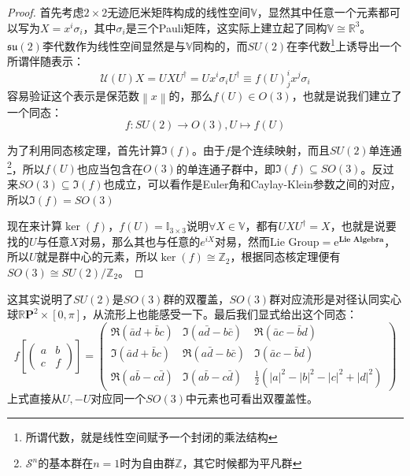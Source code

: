 \begin{proof}
	首先考虑$2\times2$无迹厄米矩阵构成的线性空间$\mathbb{V}$，显然其中任意一个元素都可以写为$X=x^i\sigma_i$，其中$\sigma_i$是三个Pauli矩阵，这实际上建立起了同构$\mathbb{V}\cong\mathbb{R}^3$。$\mathfrak{su}(2)$李代数作为线性空间显然是与$\mathbb{V}$同构的，而$SU(2)$在李代数\footnote{所谓代数，就是线性空间赋予一个封闭的乘法结构}上诱导出一个所谓伴随表示：
	\[
	\mathcal{U}(U)X=UXU^\dagger=Ux^i\sigma_i U^\dagger\equiv f(U)^i_j x^j\sigma_i
	\]
	容易验证这个表示是保范数$\left\|x\right\|$的，那么$f(U)\in O(3)$，也就是说我们建立了一个同态：
	\[f:SU(2)\to O(3),U\mapsto f(U)\]
	
	
	\setlength\parindent{2em}为了利用同态核定理，首先计算$\Im(f)$。由于$f$是个连续映射，而且$SU(2)$单连通\footnote{$\mathcal{S}^n$的基本群在$n=1$时为自由群$\mathbb{Z}$，其它时候都为平凡群}，所以$f(U)$也应当包含在$O(3)$的单连通子群中，即$\Im(f)\subseteq SO(3)$。反过来$SO(3)\subseteq \Im(f)$也成立，可以看作是Euler角和Caylay\mbox{-}Klein参数之间的对应，所以$\Im(f)=SO(3)$
	
	
	\setlength\parindent{2em}现在来计算$\ker(f)$，$f(U)=\mathbb{I}_{3\times 3}$说明$\forall X\in \mathbb{V}$，都有$UXU^\dagger=X$，也就是说要找的$U$与任意$X$对易，那么其也与任意的$e^{i X}$对易，然而$\text{Lie Group}=\mathrm{e}^{\textbf{Lie Algebra}}$，所以$U$就是群中心的元素，所以$\ker(f)\cong\mathbb{Z}_2$，根据同态核定理便有$SO(3)\cong SU(2)/\mathbb{Z}_2$。
\end{proof}
\begin{remark}
	这其实说明了$SU(2)$是$SO(3)$群的双覆盖，$SO(3)$群对应流形是对径认同实心球$\mathbb{R}\mathbf{P}^2\times [0,\pi]$，从流形上也能感受一下。最后我们显式给出这个同态：
	\[
	f\left[\begin{pmatrix}
		a& b\\
		c &f
	\end{pmatrix}\right]=\begin{pmatrix}
	\Re(\bar a d+\bar b c) & \Im(a\bar  d-b\bar c)  &\Re(\bar a c-\bar bd) \\
	\Im(\bar a d+\bar b c) & \Re(a\bar  d-b\bar c)   & \Im(\bar a c-\bar bd)\\
	\Re(a\bar b-c\bar d) & \Im(a\bar b-c\bar d) &\frac{1}{2}\left(|a|^2-|b|^2-|c|^2+|d|^2\right)
	\end{pmatrix}
	\]
	上式直接从$U,-U$对应同一个$SO(3)$中元素也可看出双覆盖性。
\end{remark}

